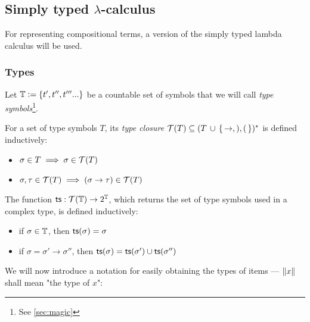 \documentclass[main.tex]{subfiles}
\begin{document}
\subsection{Simply typed $\lambda$-calculus}
\label{sec:purelambda}

For representing compositional terms, a version of the simply typed lambda calculus
will be used.

\subsubsection{Types}
\label{purelambda:types}
Let $\mathbb{T} \vcentcolon= \{ t', t'', t''' ... \}$ be a countable set of symbols that we will call
    \emph{type symbols}\footnote{See \cref{sec:magic}}.

\begin{defn}
    \label{def:tclos}
    For a set of type symbols $T$, its \emph{type closure}
    $\mathcal{T}( T ) \subseteq (T \, \cup \,\{\, \rightarrow, ), ( \,\})^*$ is defined
    inductively:

    \begin{itemize}
        \item $\sigma \in T \implies \sigma \in \mathcal{T}( T )$
        \item $\sigma, \tau \in \mathcal{T}( T ) \implies (\sigma \rightarrow \tau) \in \mathcal{T}( T )$
    \end{itemize}
\end{defn}
\begin{defn}
    The function $\mathsf{ts} : \mathcal{T}( \mathbb{T} ) \rightarrow 2^{\mathbb{T}}$, which
    returns the set of type symbols used in a complex type, is defined inductively:

    \begin{itemize}
        \item if $\sigma \in \mathbb{T}$, then $\mathsf{ts}(\sigma) = \sigma$
        \item if $\sigma = \sigma' \rightarrow \sigma''$, then
            $\mathsf{ts}(\sigma) = \mathsf{ts}(\sigma') \cup \mathsf{ts}(\sigma'')$
    \end{itemize}
\end{defn}

We will now introduce a notation for easily obtaining the types of items ---
$\|x\|$ shall mean "the type of $x$":
\end{document}
